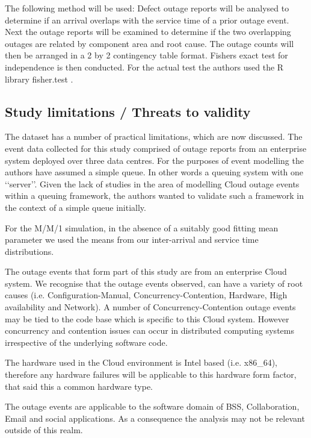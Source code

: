 \documentclass[5p]{elsarticle}
\begin{document}
The following method will be used: Defect outage reports will be analysed to determine if an arrival overlaps with the service time of a prior outage event. Next the outage reports will be examined to determine if the two overlapping outages are related by component area and root cause. The outage counts will then be arranged in a 2 by 2 contingency table format. Fishers exact test for independence\cite{fisher1922interpretation}\cite{fisher1925statistical} is then conducted. For the actual test the authors used the R library fisher.test \cite{FisherExact}. 

\subsection{Study limitations / Threats to validity}

The dataset has a number of practical limitations, which are now discussed. The event data collected for this study comprised of outage reports from an enterprise system deployed over three data centres. For the purposes of event modelling the authors have assumed a simple queue. In other words a queuing system with one \lq\lq server\rq\rq. Given the lack of studies in the area of modelling Cloud outage events within a queuing framework, the authors wanted to validate such a framework in the context of a simple queue initially. 

For the M/M/1 simulation, in the absence of a suitably good fitting mean parameter we used the means from our inter-arrival and service time distributions.

The outage events that form part of this study are from an enterprise Cloud system. We recognise that the outage events observed, can have a variety of root causes (i.e. Configuration-Manual, Concurrency-Contention, Hardware, High availability and Network). A number of Concurrency-Contention outage events may be tied to the code base which is specific to this Cloud system. However concurrency and contention issues can occur in distributed computing systems irrespective of the underlying software code.

The hardware used in the Cloud environment is Intel based (i.e. x86\_64), therefore any hardware failures will be applicable to this hardware form factor, that said this a common hardware type.

The outage events are applicable to the software domain of BSS, Collaboration, Email and social applications. As a consequence the analysis may not be relevant outside of this realm.
\end{document}
